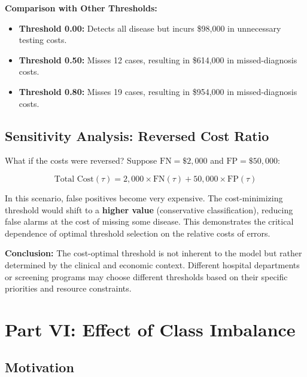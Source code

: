 \documentclass[11pt]{article}
\begin{document}
\textbf{Comparison with Other Thresholds:}
\begin{itemize}
    \item \textbf{Threshold 0.00:} Detects all disease but incurs \$98,000 in unnecessary testing costs.
    \item \textbf{Threshold 0.50:} Misses 12 cases, resulting in \$614,000 in missed-diagnosis costs.
    \item \textbf{Threshold 0.80:} Misses 19 cases, resulting in \$954,000 in missed-diagnosis costs.
\end{itemize}

\subsection{Sensitivity Analysis: Reversed Cost Ratio}

What if the costs were reversed? Suppose $\text{FN} = \$2,000$ and $\text{FP} = \$50,000$:

\begin{equation}
    \text{Total Cost}(\tau) = 2{,}000 \times \text{FN}(\tau) + 50{,}000 \times \text{FP}(\tau)
\end{equation}

In this scenario, false positives become very expensive. The cost-minimizing threshold would shift to a \textbf{higher value} (conservative classification), reducing false alarms at the cost of missing some disease. This demonstrates the critical dependence of optimal threshold selection on the relative costs of errors.

\textbf{Conclusion:} The cost-optimal threshold is not inherent to the model but rather determined by the clinical and economic context. Different hospital departments or screening programs may choose different thresholds based on their specific priorities and resource constraints.

\newpage

\section{Part VI: Effect of Class Imbalance}

\subsection{Motivation}
\end{document}
